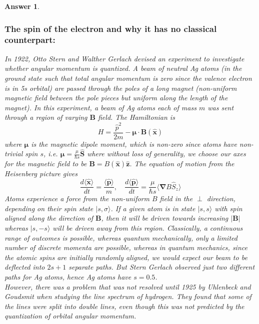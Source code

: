 \documentclass[a4paper]{article}
\newtheorem{ans}{Answer}[subsection]
\theoremstyle{new}
\begin{document}
\begin{ans}
\subsubsection*{The spin of the electron and why it has no classical counterpart:}
In 1922, Otto Stern and Walther Gerlach devised an experiment to investigate whether angular momentum is quantized. A beam of neutral Ag atoms (in the ground state such that total angular momentum is zero since the valence electron is in 5s orbital) are passed through the poles of a long magnet (non-uniform magnetic field between the pole pieces but uniform along the length of the magnet). In this experiment, a beam of Ag atoms each of mass $m$ was sent through a region of varying $\mathbf{B}$ field. The Hamiltonian is 
$$H=\frac{\hat{p}^2}{2m}-\boldsymbol{\mu}\cdot\mathbf{B}(\mathbf{\hat{x}})$$
where $\boldsymbol{\mu}$ is the magnetic dipole moment, which is non-zero since atoms have non-trivial spin $s$, i.e. $\boldsymbol{\mu}=\frac{\mu}{\hbar s}\mathbf{\hat{S}}$ where without loss of generality, we choose our axes for the magnetic field to be $\mathbf{B}=B(\mathbf{\hat{x}})\mathbf{\hat{z}}$. The equation of motion from the Heisenberg picture gives
$$\frac{d\langle\mathbf{\hat{x}}\rangle}{dt}=\frac{\langle\mathbf{\hat{p}}\rangle}{m},\quad \frac{d\langle\mathbf{\hat{p}}\rangle}{dt}=\frac{\mu}{\hbar s}\langle\boldsymbol{\nabla}B \hat{S}_z\rangle$$
Atoms experience a force from the non-uniform $B$ field in the $\perp$ direction, depending on their spin state $|s,\sigma\rangle$. If a given atom is in state $|s,s\rangle$ with spin aligned along the direction of $\mathbf{B}$, then it will be driven towards increasing $|\mathbf{B}|$ whereas $|s,-s\rangle$ will be driven away from this region. Classically, a continuous range of outcomes is possible, whereas quantum mechanically, only a limited number of discrete momenta are possible, whereas in quantum mechanics, since the atomic spins are initially randomly aligned, we would expect our beam to be deflected into $2s+1$ separate paths. But Stern Gerlach observed just two different paths for Ag atoms, hence Ag atoms have $s=0.5$. \\[5pt]
However, there was a problem that was not resolved until 1925 by Uhlenbeck and Goudsmit when studying the line spectrum of hydrogen. They found that some of the lines were split into double lines, even though this was not predicted by the quantization of orbital angular momentum.\\[5pt]

\end{ans}
\end{document}
